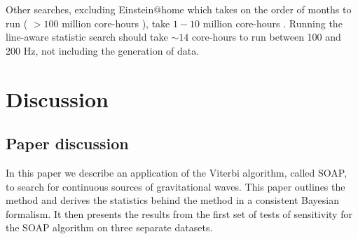Other searches, excluding Einstein@home which takes on the order of months to
run ( $>100$ million core-hours \citep{walsh2016ComparisonMethods}), take
$1-10$ million core-hours \citep{walsh2016ComparisonMethods}.
Running the line-aware statistic search should take $\sim 14$ core-hours to run between 100 and 200 Hz, not including the generation of data.
 
\section{\label{soap:dicussion}Discussion}

\subsection{Paper discussion}

In this paper we describe an application of the Viterbi algorithm, called SOAP,
to search for continuous sources of gravitational waves.  This paper outlines
the method and derives the statistics behind the method in a consistent
Bayesian formalism. It then presents the results from the first set of tests of
sensitivity for the SOAP algorithm on three separate datasets.

